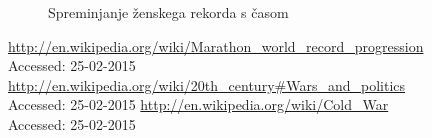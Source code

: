 \documentclass[11pt,a4paper]{article}
\begin{document}
\begin{figure}[H]
  \caption{Spreminjanje ženskega rekorda s časom}
  \label{fig:Slika 4}
\end{figure}

\newpage
\begin{thebibliography}{3}
  \url{http://en.wikipedia.org/wiki/Marathon_world_record_progression}\\
  {Accessed: 25-02-2015}
  \url{http://en.wikipedia.org/wiki/20th_century#Wars_and_politics}\\
  {Accessed: 25-02-2015}
  \url{http://en.wikipedia.org/wiki/Cold_War}\\
  {Accessed: 25-02-2015}


\end{thebibliography}
\end{document}
